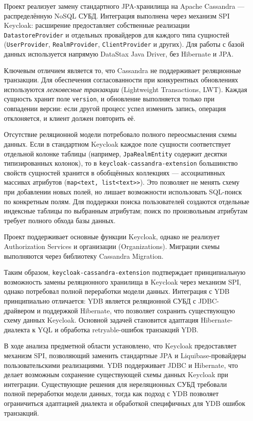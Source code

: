 \documentclass[times]{itmo-student-thesis}
\begin{document}
Проект реализует замену стандартного JPA-хранилища на Apache Cassandra --- распределённую
NoSQL СУБД. Интеграция выполнена через механизм SPI Keycloak: расширение предоставляет
собственные реализации \texttt{DatastoreProvider} и отдельных провайдеров для каждого типа
сущностей (\texttt{UserProvider}, \texttt{RealmProvider}, \texttt{ClientProvider} и других).
Для работы с базой данных используется напрямую DataStax Java Driver, без Hibernate и JPA.

Ключевым отличием является то, что Cassandra не поддерживает реляционные транзакции.
Для обеспечения согласованности при конкурентных обновлениях используются
\textit{легковесные транзакции} (Lightweight Transactions, LWT).
Каждая сущность хранит поле \texttt{version},
и обновление выполняется только при совпадении версии: если другой процесс успел изменить
запись, операция отклоняется, и клиент должен повторить её.

Отсутствие реляционной модели потребовало полного переосмысления схемы данных. Если в
стандартном Keycloak каждое поле сущности соответствует отдельной колонке таблицы
(например, \texttt{JpaRealmEntity} содержит десятки типизированных колонок), то в
\texttt{keycloak-cassandra-extension} большинство свойств сущностей хранится в обобщённых
коллекциях --- ассоциативных массивах атрибутов (\texttt{map<text, list<text>>}).
Это позволяет не менять схему при добавлении новых полей, но лишает возможности использовать
SQL-поиск по конкретным полям. Для поддержки поиска пользователей создаются отдельные
индексные таблицы по выбранным атрибутам; поиск по произвольным атрибутам требует полного
обхода базы данных.

Проект поддерживает основные функции Keycloak, однако не реализует Authorization Services
и организации (Organizations). Миграции схемы выполняются через библиотеку Cassandra
Migration.

Таким образом, \texttt{keycloak-cassandra-extension} подтверждает принципиальную
возможность замены реляционного хранилища в Keycloak через механизм SPI, однако
потребовал полной переработки модели данных. Интеграция с YDB принципиально отличается:
YDB является реляционной СУБД с JDBC-драйвером и поддержкой Hibernate, что позволяет
сохранить существующую схему данных Keycloak. Основной задачей становится адаптация
Hibernate-диалекта к YQL и обработка retryable-ошибок транзакций YDB.

\chapterconclusion

В ходе анализа предметной области установлено, что Keycloak предоставляет механизм SPI,
позволяющий заменить стандартные JPA и Liquibase-провайдеры пользовательскими реализациями.
YDB поддерживает JDBC и Hibernate, что делает возможным сохранение существующей схемы данных
Keycloak при интеграции. Существующие решения для нереляционных СУБД требовали полной
переработки модели данных, тогда как подход с YDB позволяет ограничиться адаптацией
диалекта и обработкой специфичных для YDB ошибок транзакций.
\end{document}
